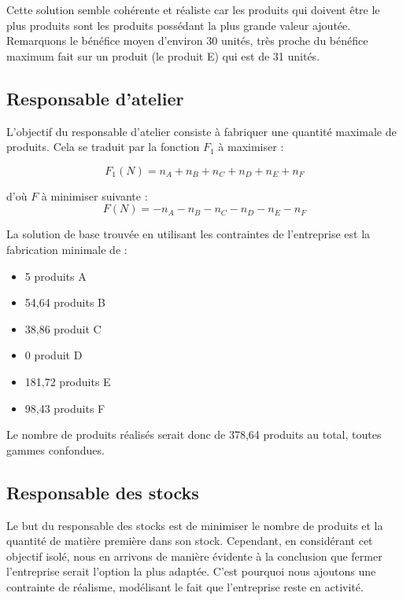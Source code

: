 \documentclass[a4paper,10pt]{article}
\begin{document}
Cette solution semble cohérente et réaliste car les produits qui doivent être le plus produits sont les produits possédant la plus grande valeur ajoutée. Remarquons le bénéfice moyen d'environ 30 unités, très proche du bénéfice maximum fait sur un produit (le produit E) qui est de 31 unités.


\subsection{Responsable d'atelier}

L'objectif du responsable d'atelier consiste à fabriquer une quantité maximale de produits. Cela se traduit par la fonction $F_1$ à maximiser :

$$F_1(N) = n_A + n_B + n_C + n_D + n_E + n_F$$

d'où $F$ à minimiser suivante :
$$F(N) = - n_A - n_B - n_C - n_D - n_E - n_F$$

La solution de base trouvée en utilisant les contraintes de l'entreprise est la fabrication minimale de :\newline
\begin{itemize}
\item[\textbullet] 5 produits A
\item[\textbullet] 54,64 produits B
\item[\textbullet] 38,86 produit C
\item[\textbullet] 0 produit D
\item[\textbullet] 181,72 produits E
\item[\textbullet] 98,43 produits F\newline
\end{itemize}
Le nombre de produits réalisés serait donc de 378,64 produits au total, toutes gammes confondues.


\subsection{Responsable des stocks}

Le but du responsable des stocks est de minimiser le nombre de produits et la quantité de matière première dans son stock. Cependant, en considérant cet objectif isolé, nous en arrivons de manière évidente à la conclusion que fermer l'entreprise serait l'option la plus adaptée. C'est pourquoi nous ajoutons une contrainte de réalisme, modélisant le fait que l'entreprise reste en activité.\newline
\end{document}
